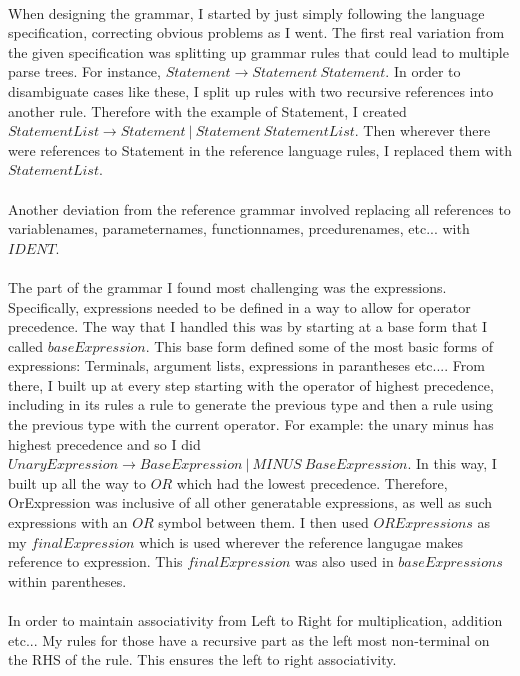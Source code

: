 \documentclass[12pt, a3paper]{article}
\begin{document}
\maketitle

\paragraph{}
When designing the grammar, I started by just simply following the language specification, correcting obvious problems as I went.
The first real variation from the given specification was splitting up grammar rules that could lead to multiple parse trees.
For instance, $Statement \rightarrow Statement \ Statement.$ In order to disambiguate cases like these, I split up rules with two recursive references into another rule.
Therefore with the example of Statement, I created $StatementList \rightarrow Statement \ | \ Statement \ StatementList.$ Then wherever there were references to Statement in the
reference language rules, I replaced them with $StatementList$.

\paragraph{}
Another deviation from the reference grammar involved replacing all references to variablenames, parameternames, functionnames, prcedurenames, etc... with $IDENT$.

\paragraph{}
The part of the grammar I found most challenging was the expressions. Specifically, expressions needed to be defined in a way to allow for operator precedence.
The way that I handled this was by starting at a base form that I called $baseExpression$. This base form defined some of the  most basic forms of expressions: Terminals, argument lists, expressions in parantheses etc.... From there, I built up at every step starting with the operator of highest precedence, including in its rules a rule to generate the previous type and then a rule using the previous type with the current operator. For example: the unary minus has highest precedence and so I did $UnaryExpression \rightarrow BaseExpression \ | \  MINUS\  BaseExpression$. In this way, I built up all the way to $OR$ which had the lowest precedence. Therefore, OrExpression was inclusive of all other generatable expressions, as well as such expressions with an $OR$ symbol between them. I then used $ORExpressions$ as my $finalExpression$ which is used wherever the reference langugae makes reference to expression. This $finalExpression$ was also used in $baseExpressions$ within parentheses.

\paragraph{}
In order to maintain associativity from Left to Right for multiplication, addition etc... My rules for those have a recursive part as the left most non-terminal on the RHS of the rule. This ensures the left to right associativity.
\end{document}
